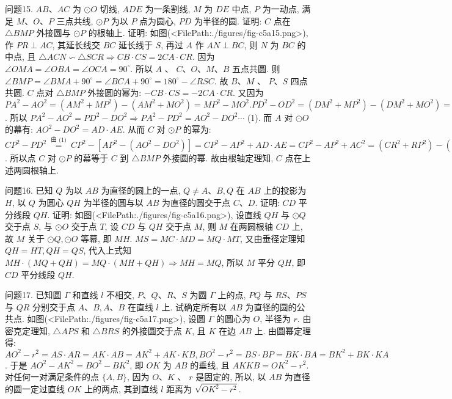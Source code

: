 问题15. $A B 、 A C$ 为 $\odot O$ 切线, $A D E$ 为一条割线, $M$ 为 $D E$ 中点, $P$ 为一动点, 满足 $M 、 O 、 P$ 三点共线, $\odot P$ 为以 $P$ 点为圆心, $P D$ 为半径的圆.
证明: $C$ 点在 $\triangle B M P$ 外接圆与 $\odot P$ 的根轴上.
证明: 如图(<FilePath:./figures/fig-c5a15.png>), 作 $P R \perp A C$, 其延长线交 $B C$ 延长线于 $S$, 再过 $A$ 作 $A N \perp B C$, 则 $N$ 为 $B C$ 的中点, 且 $\triangle A C N \backsim \triangle S C R \Rightarrow C B \cdot C S=2 C A \cdot C R$. 因为 $\angle O M A=\angle O B A=\angle O C A=90^{\circ}$. 所以 $A$ 、 $C 、 O 、 M 、 B$ 五点共圆.
则 $\angle B M P=\angle B M A+ 90^{\circ}=\angle B C A+90^{\circ}=180^{\circ}-\angle R S C$. 故 $B 、 M$ 、 $P 、 S$ 四点共圆.
$C$ 点对 $\triangle B M P$ 外接圆的幂为: $-C B \cdot C S=-2 C A \cdot C R$. 又因为 $P A^2-A O^2=\left(A M^2+M P^2\right)-\left(A M^2+M O^2\right)=M P^2-M O^2 . P D^2-O D^2=\left(D M^2+\right. \left.M P^2\right)-\left(D M^2+M O^2\right)=M P^2-M O^2$. 所以 $P A^2-A O^2=P D^2-D O^2 \Rightarrow P A^2-P D^2=A O^2-D O^2 \cdots$ (1). 而 $A$ 对 $\odot O$ 的幕有: $A O^2-D O^2=A D \cdot A E$.
从而 $C$ 对 $\odot P$ 的幂为: $C P^2-P D^2 \stackrel{\text { 由 (1) }}{=} C P^2-\left[A P^2-\left(A O^2-D O^2\right)\right]=C P^2- A P^2+A D \cdot A E=C P^2-A P^2+A C^2=\left(C R^2+R P^2\right)-\left(A R^2+R P^2\right)+ A C^2=C R^2-(A C+C R)^2+A C^2=-2 C A \cdot C R$. 所以点 $C$ 对 $\odot P$ 的幕等于 $C$ 到 $\triangle B M P$ 外接圆的幂.
故由根轴定理知, $C$ 点在上述两圆根轴上.



问题16. 已知 $Q$ 为以 $A B$ 为直径的圆上的一点, $Q \neq A 、 B, Q$ 在 $A B$ 上的投影为 $H$, 以 $Q$ 为圆心 $Q H$ 为半径的圆与以 $A B$ 为直径的圆交于点 $C 、 D$. 证明: $C D$ 平分线段 $Q H$.
证明: 如图(<FilePath:./figures/fig-c5a16.png>), 设直线 $Q H$ 与 $\odot Q$ 交于点 $S$, 与 $\odot O$ 交于点 $T$, 设 $C D$ 与 $Q H$ 交于点 $M$, 则 $M$ 在两圆根轴 $C D$ 上, 故 $M$ 关于 $\odot Q, \odot O$ 等幕, 即 $M H$. $M S=M C \cdot M D=M Q \cdot M T$, 又由垂径定理知 $Q H=H T, Q H=Q S$, 代入上式知 $M H \cdot(M Q+ Q H)=M Q \cdot(M H+Q H) \Rightarrow M H=M Q$, 所以 $M$ 平分 $Q H$, 即 $C D$ 平分线段 $Q H$.



问题17. 已知圆 $\Gamma$ 和直线 $l$ 不相交, $P 、 Q 、 R 、 S$ 为圆 $\Gamma$ 上的点, $P Q$ 与 $R S 、 P S$ 与 $Q R$ 分别交于点 $A 、 B, A 、 B$ 在直线 $l$ 上.
试确定所有以 $A B$ 为直径的圆的公共点.
如图(<FilePath:./figures/fig-c5a17.png>), 设圆 $\Gamma$ 的圆心为 $O$, 半径为 $r$. 由密克定理知, $\triangle A P S$ 和 $\triangle B R S$ 的外接圆交于点 $K$, 且 $K$ 在边 $A B$ 上.
由圆幂定理得: $A O^2-r^2=A S \cdot A R= A K \cdot A B=A K^2+A K \cdot K B, B O^2-r^2=B S \cdot B P=B K \cdot B A=B K^2+B K \cdot K A$. 于是 $A O^2- A K^2=B O^2-B K^2$, 即 $O K$ 为 $A B$ 的垂线, 且 $A K K B=O K^2-r^2$.
对任何一对满足条件的点 $\{A, B\}$, 因为 $O 、 K$ 、 $r$ 是固定的, 所以, 以 $A B$ 为直径的圆一定过直线
$O K$ 上的两点, 其到直线 $l$ 距离为 $\sqrt{O K^2-r^2}$.



